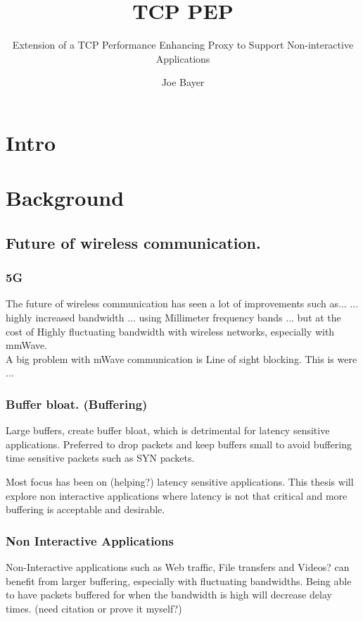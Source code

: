 \documentclass[a4paper,english, 11pt]{report}
\author{Joe Bayer}
\title{TCP PEP}
\subtitle{Extension of a TCP Performance Enhancing Proxy to
Support Non-interactive Applications}
\begin{document}
\uiomasterfp[program={Informatics: Programming and System Architecture}, supervisor={Michael Welzl}]

\tableofcontents

\chapter{Intro}

\chapter{Background}

\section{Future of wireless communication.}
\subsection{5G}
The future of wireless communication has seen a lot of improvements such as...
... highly increased bandwidth ... using Millimeter frequency bands ... but at the cost of Highly fluctuating bandwidth with wireless networks, especially with mmWave.\\A big problem with mWave communication is Line of sight blocking. This is were ...

\subsection{Buffer bloat. (Buffering)}
Large buffers, create buffer bloat, which is detrimental for latency sensitive applications. Preferred to drop packets and keep buffers small to avoid buffering time sensitive packets such as SYN packets.

Most focus has been on (helping?) latency sensitive applications. This thesis will explore non interactive applications where latency is not that critical and more buffering is acceptable and desirable.

\subsection{Non Interactive Applications}
Non-Interactive applications such as Web traffic, File transfers and Videos? can benefit from larger buffering, especially with fluctuating bandwidths. Being able to have packets buffered for when the bandwidth is high will decrease delay times. (need citation or prove it myself?) 
\end{document}
